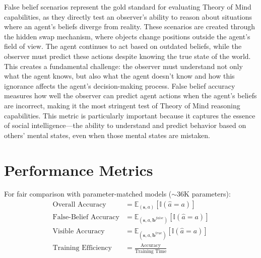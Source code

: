 \documentclass[11pt]{article}
\begin{document}
False belief scenarios represent the gold standard for evaluating Theory of Mind capabilities, as they directly test an observer's ability to reason about situations where an agent's beliefs diverge from reality. These scenarios are created through the hidden swap mechanism, where objects change positions outside the agent's field of view. The agent continues to act based on outdated beliefs, while the observer must predict these actions despite knowing the true state of the world. This creates a fundamental challenge: the observer must understand not only what the agent knows, but also what the agent doesn't know and how this ignorance affects the agent's decision-making process. False belief accuracy measures how well the observer can predict agent actions when the agent's beliefs are incorrect, making it the most stringent test of Theory of Mind reasoning capabilities. This metric is particularly important because it captures the essence of social intelligence—the ability to understand and predict behavior based on others' mental states, even when those mental states are mistaken.

\section{Performance Metrics}

For fair comparison with parameter-matched models ($\sim$36K parameters):
\begin{align}
    \text{Overall Accuracy} &= \mathbb{E}_{(\mathbf{s}, a)} [\mathbb{I}(\hat{a} = a)] \\
    \text{False-Belief Accuracy} &= \mathbb{E}_{(\mathbf{s}, a, \mathbf{b}^{false})} [\mathbb{I}(\hat{a} = a)] \\
    \text{Visible Accuracy} &= \mathbb{E}_{(\mathbf{s}, a, \mathbf{b}^{true})} [\mathbb{I}(\hat{a} = a)] \\
    \text{Training Efficiency} &= \frac{\text{Accuracy}}{\text{Training Time}}
\end{align}
\end{document}
